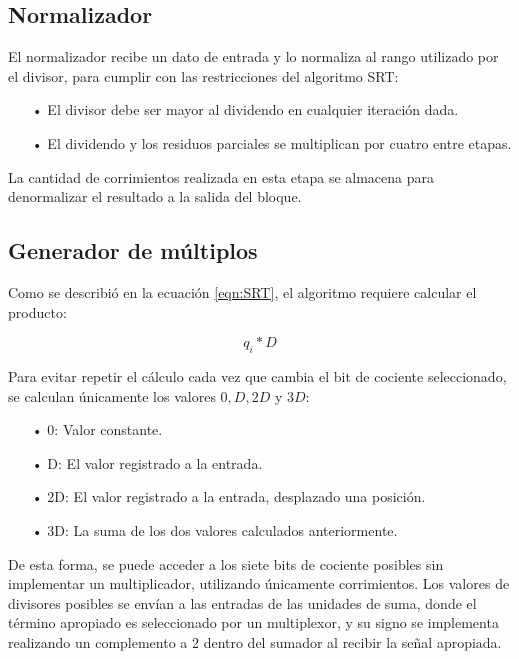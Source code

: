 \documentclass[12pt,a4paper]{article} %
\begin{document}
\subsection{Normalizador}

El normalizador recibe un dato de entrada y lo normaliza al rango utilizado por el divisor, para cumplir con las restricciones del algoritmo SRT:

\begin{itemize}
\item[•]El divisor debe ser mayor al dividendo en cualquier iteración dada.
\item[•]El dividendo y los residuos parciales se multiplican por cuatro entre etapas.
\end{itemize}

La cantidad de corrimientos realizada en esta etapa se almacena para denormalizar el resultado a la salida del bloque.

\subsection{Generador de múltiplos}

Como se describió en la ecuación \ref{eqn:SRT}, el algoritmo requiere calcular el producto:

\begin{equation*}\label{eqn:productoD}
q_i*D
\end{equation*}

Para evitar repetir el cálculo cada vez que cambia el bit de cociente seleccionado, se calculan únicamente los valores $0,D,2D$ y $3D$:

\begin{itemize}
\item[•]0: Valor constante.
\item[•]D: El valor registrado a la entrada.
\item[•]2D: El valor registrado a la entrada, desplazado una posición.
\item[•]3D: La suma de los dos valores calculados anteriormente.
\end{itemize}

De esta forma, se puede acceder a los siete bits de cociente posibles sin implementar un multiplicador, utilizando únicamente corrimientos. Los valores de divisores posibles se envían a las entradas de las unidades de suma, donde el término apropiado es seleccionado por un multiplexor, y su signo se implementa realizando un complemento a 2 dentro del sumador al recibir la señal apropiada.
\end{document}
